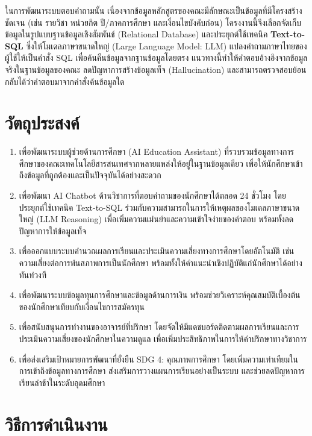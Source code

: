 ในการพัฒนาระบบตอบคำถามนั้น เนื่องจากข้อมูลหลักสูตรของคณะมีลักษณะเป็นข้อมูลที่มีโครงสร้างชัดเจน (เช่น รายวิชา หน่วยกิต ปี/ภาคการศึกษา และเงื่อนไขบังคับก่อน) โครงงานนี้จึงเลือกจัดเก็บข้อมูลในรูปแบบฐานข้อมูลเชิงสัมพันธ์ (Relational Database) และประยุกต์ใช้เทคนิค \textbf{Text-to-SQL} ซึ่งให้โมเดลภาษาขนาดใหญ่ (Large Language Model: LLM) แปลงคำถามภาษาไทยของผู้ใช้ให้เป็นคำสั่ง SQL เพื่อค้นคืนข้อมูลจากฐานข้อมูลโดยตรง แนวทางนี้ทำให้คำตอบอ้างอิงจากข้อมูลจริงในฐานข้อมูลของคณะ ลดปัญหาการสร้างข้อมูลเท็จ (Hallucination) และสามารถตรวจสอบย้อนกลับได้ว่าคำตอบมาจากคำสั่งค้นข้อมูลใด

\section{วัตถุประสงค์}

\begin{enumerate}
    \item เพื่อพัฒนาระบบผู้ช่วยด้านการศึกษา (AI Education Assistant) ที่รวบรวมข้อมูลทางการศึกษาของคณะเทคโนโลยีสารสนเทศจากหลายแหล่งให้อยู่ในฐานข้อมูลเดียว เพื่อให้นักศึกษาเข้าถึงข้อมูลที่ถูกต้องและเป็นปัจจุบันได้อย่างสะดวก
    \item เพื่อพัฒนา AI Chatbot ด้านวิชาการที่ตอบคำถามของนักศึกษาได้ตลอด 24 ชั่วโมง โดยประยุกต์ใช้เทคนิค Text-to-SQL ร่วมกับความสามารถในการให้เหตุผลของโมเดลภาษาขนาดใหญ่ (LLM Reasoning) เพื่อเพิ่มความแม่นยำและความเข้าใจง่ายของคำตอบ พร้อมทั้งลดปัญหาการให้ข้อมูลเท็จ
    \item เพื่อออกแบบระบบคำนวณผลการเรียนและประเมินความเสี่ยงทางการศึกษาโดยอัตโนมัติ เช่น ความเสี่ยงต่อการพ้นสภาพการเป็นนักศึกษา พร้อมทั้งให้คำแนะนำเชิงปฏิบัติแก่นักศึกษาได้อย่างทันท่วงที
    \item เพื่อพัฒนาระบบข้อมูลทุนการศึกษาและข้อมูลด้านการเงิน พร้อมช่วยวิเคราะห์คุณสมบัติเบื้องต้นของนักศึกษาเทียบกับเงื่อนไขการสมัครทุน
    \item เพื่อสนับสนุนการทำงานของอาจารย์ที่ปรึกษา โดยจัดให้มีแดชบอร์ดติดตามผลการเรียนและการประเมินความเสี่ยงของนักศึกษาในความดูแล เพื่อเพิ่มประสิทธิภาพในการให้คำปรึกษาทางวิชาการ
    \item เพื่อส่งเสริมเป้าหมายการพัฒนาที่ยั่งยืน SDG 4: คุณภาพการศึกษา โดยเพิ่มความเท่าเทียมในการเข้าถึงข้อมูลทางการศึกษา ส่งเสริมการวางแผนการเรียนอย่างเป็นระบบ และช่วยลดปัญหาการเรียนล่าช้าในระดับอุดมศึกษา
\end{enumerate}

\section{วิธีการดำเนินงาน}

